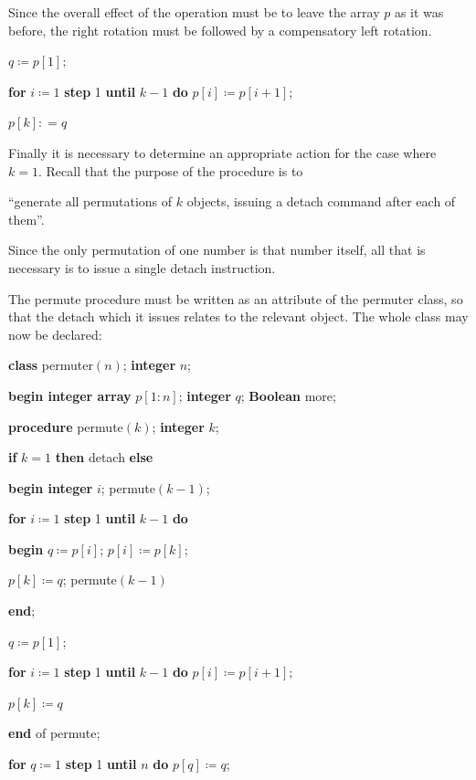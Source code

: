 \documentclass[twoside,11pt]{book}
\begin{document}
\noindent
Since the overall effect of the operation must be to leave the array $p$ as it was before, the right rotation must be followed by a compensatory left rotation.

\quad $q\coloneq p[1];$

\quad \textbf{for} $i\coloneq 1$ \textbf{step} 1 \textbf{until} $k - 1$ \textbf{do} $p[i]\coloneq p[i + 1]$;

\quad $p[k]: = q$

\noindent
Finally it is necessary to determine an appropriate action for the case where $k = 1$. Recall that the purpose of the procedure is to 

\parindent\quad ``generate all permutations of $k$ objects, issuing a detach command after each of them''.

\noindent
Since the only permutation of one number is that number itself, all that is necessary is to issue a single detach instruction.

The permute procedure must be written as an attribute of the permuter class, so that the detach which it issues relates to the relevant object. The whole class may now be declared:

\quad \textbf{class} permuter$(n)$; \textbf{integer} $n$;

\quad \textbf{begin integer array} $p[1:n]$; \textbf{integer} $q$; \textbf{Boolean} more;

\quad \quad \textbf{procedure} permute$(k)$; \textbf{integer} $k$;

\quad \quad \textbf{if} $k = 1$ \textbf{then} detach \textbf{else}

\quad \quad \textbf{begin integer} $i$; permute$(k - 1)$;

\quad \quad \quad \textbf{for} $i\coloneq 1$ \textbf{step} 1 \textbf{until} $k - 1$ \textbf{do}

\quad \quad \quad \textbf{begin} $q\coloneq p[i]$; $p[i]\coloneq p[k]$;

\quad \quad \quad \quad $p[k]\coloneq q$; permute$(k - 1)$

\quad \quad \quad \textbf{end};

\quad \quad \quad $q\coloneq p[1]$;

\quad \quad \quad \textbf{for} $i\coloneq 1$ \textbf{step} 1 \textbf{until} $k - 1$ \textbf{do} $p[i] \coloneq p[i + 1]$;

\quad \quad \quad $p[k]\coloneq q$

\quad \quad \textbf{end} of permute;

\quad \quad \textbf{for} $q\coloneq 1$ \textbf{step} 1 \textbf{until} $n$ \textbf{do} $p[q] \coloneq q$;
\end{document}
